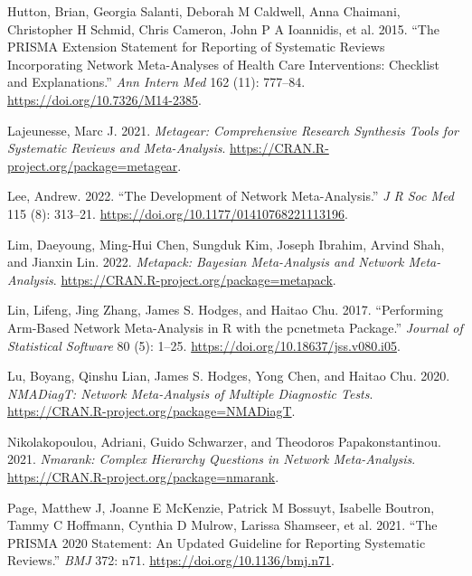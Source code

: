 \begin{CSLReferences}{1}{0}
\leavevmode{}%
Hutton, Brian, Georgia Salanti, Deborah M Caldwell, Anna Chaimani, Christopher H Schmid, Chris Cameron, John P A Ioannidis, et al. 2015. {``The PRISMA Extension Statement for Reporting of Systematic Reviews Incorporating Network Meta-Analyses of Health Care Interventions: Checklist and Explanations.''} \emph{Ann Intern Med} 162 (11): 777--84. \url{https://doi.org/10.7326/M14-2385}.

\leavevmode{}%
Lajeunesse, Marc J. 2021. \emph{Metagear: Comprehensive Research Synthesis Tools for Systematic Reviews and Meta-Analysis}. \url{https://CRAN.R-project.org/package=metagear}.

\leavevmode{}%
Lee, Andrew. 2022. {``The Development of Network Meta-Analysis.''} \emph{J R Soc Med} 115 (8): 313--21. \url{https://doi.org/10.1177/01410768221113196}.

\leavevmode{}%
Lim, Daeyoung, Ming-Hui Chen, Sungduk Kim, Joseph Ibrahim, Arvind Shah, and Jianxin Lin. 2022. \emph{Metapack: Bayesian Meta-Analysis and Network Meta-Analysis}. \url{https://CRAN.R-project.org/package=metapack}.

\leavevmode{}%
Lin, Lifeng, Jing Zhang, James S. Hodges, and Haitao Chu. 2017. {``Performing Arm-Based Network Meta-Analysis in {R} with the {pcnetmeta} Package.''} \emph{Journal of Statistical Software} 80 (5): 1--25. \url{https://doi.org/10.18637/jss.v080.i05}.

\leavevmode{}%
Lu, Boyang, Qinshu Lian, James S. Hodges, Yong Chen, and Haitao Chu. 2020. \emph{NMADiagT: Network Meta-Analysis of Multiple Diagnostic Tests}. \url{https://CRAN.R-project.org/package=NMADiagT}.

\leavevmode{}%
Nikolakopoulou, Adriani, Guido Schwarzer, and Theodoros Papakonstantinou. 2021. \emph{Nmarank: Complex Hierarchy Questions in Network Meta-Analysis}. \url{https://CRAN.R-project.org/package=nmarank}.

\leavevmode{}%
Page, Matthew J, Joanne E McKenzie, Patrick M Bossuyt, Isabelle Boutron, Tammy C Hoffmann, Cynthia D Mulrow, Larissa Shamseer, et al. 2021. {``The PRISMA 2020 Statement: An Updated Guideline for Reporting Systematic Reviews.''} \emph{BMJ} 372: n71. \url{https://doi.org/10.1136/bmj.n71}.


\end{CSLReferences}
